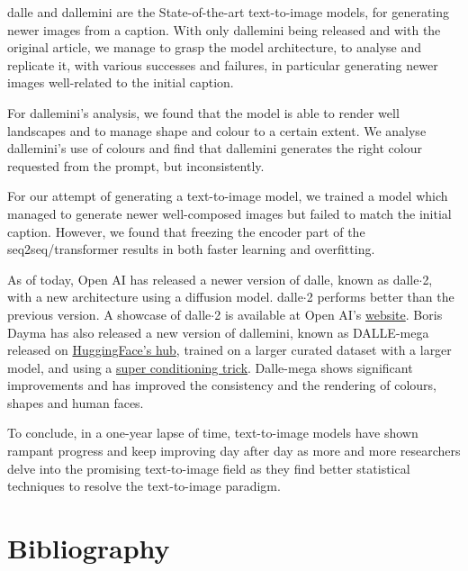 \documentclass{article}
\begin{document}
\begin{paracol}{2}

\gls{dalle} and \gls{dallemini} are the State-of-the-art text-to-image models, for generating newer images from a caption. With only \gls{dallemini} being released and with the original article, we manage to grasp the model architecture, to analyse and replicate it, with various successes and failures, in particular generating newer images well-related to the initial caption.

For \gls{dallemini}'s analysis, we found that the model is able to render well landscapes and to manage shape and colour to a certain extent. We analyse \gls{dallemini}'s use of colours and find that \gls{dallemini} generates the right colour requested from the prompt, but inconsistently. 

For our attempt of generating a text-to-image model, we trained a model which managed to generate newer well-composed images but failed to match the initial caption. However, we found that freezing the encoder part of the seq2seq/transformer results in both faster learning and overfitting.

\switchcolumn

As of today, Open AI has released a newer version of \gls{dalle}, known as \gls{dalle}$\cdot$2, with a new architecture using a diffusion model. \gls{dalle}$\cdot$2 performs better than the previous version. A showcase of \gls{dalle}$\cdot$2 is available at Open AI's \href{https://openai.com/dall-e-2/}{website}.
Boris Dayma has also released a new version of \gls{dallemini}, known as DALLE-mega released on \href{https://huggingface.co/spaces/dalle-mini/dalle-mini}{HuggingFace's hub}, trained on a larger curated dataset with a larger model, and using a  \href{https://twitter.com/rivershavewings/status/1478093658716966912}{super conditioning trick}. Dalle-mega shows significant improvements and has improved the consistency and the rendering of colours, shapes and human faces.

To conclude, in a one-year lapse of time, text-to-image models have shown rampant progress and keep improving day after day as more and more researchers delve into the promising text-to-image field as they find better statistical techniques to resolve the text-to-image paradigm.

\end{paracol}

\pagebreak
{}
{}
\section*{Bibliography}
\end{document}
